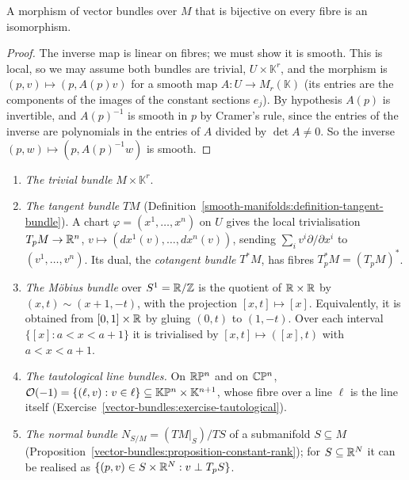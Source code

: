 \begin{lemma}\label{vector-bundles:lemma-bijective-morphism}
A morphism of vector bundles over $M$ that is bijective on every fibre is an isomorphism.
\end{lemma}

\begin{proof}
The inverse map is linear on fibres; we must show it is smooth. This is local, so we may assume both bundles are trivial, $U \times \mathbb{K}^r$, and the morphism is
$(p, v) \mapsto (p, A(p)v)$ for a smooth map $A \colon U \to M_r(\mathbb{K})$ (its entries are the components of the images of the constant sections $e_j$). By hypothesis $A(p)$ is
invertible, and $A(p)^{-1}$ is smooth in $p$ by Cramer's rule, since the entries of the inverse are polynomials in the entries of $A$ divided by $\det A \neq 0$. So the inverse
$(p, w) \mapsto (p, A(p)^{-1}w)$ is smooth.
\end{proof}

\begin{example}\label{vector-bundles:example-bundles}
\begin{enumerate}
\item \emph{The trivial bundle} $M \times \mathbb{K}^r$.
\item \emph{The tangent bundle} $TM$ (Definition~\ref{smooth-manifolds:definition-tangent-bundle}). A chart $\varphi = (x^1, \ldots, x^n)$ on $U$ gives the local trivialisation
$T_pM \to \mathbb{R}^n$, $v \mapsto (dx^1(v), \ldots, dx^n(v))$, sending $\sum_iv^i\partial/\partial x^i$ to $(v^1, \ldots, v^n)$. Its dual, the \emph{cotangent bundle} $T^*M$, has fibres
$T_p^*M = (T_pM)^*$.
\item \emph{The M\"obius bundle} over $S^1 = \mathbb{R}/\mathbb{Z}$ is the quotient of $\mathbb{R} \times \mathbb{R}$ by $(x, t) \sim (x + 1, -t)$, with the projection $[x, t] \mapsto [x]$. Equivalently,
it is obtained from $[0, 1] \times \mathbb{R}$ by gluing $(0, t)$ to $(1, -t)$. Over each interval $\{[x] : a < x < a + 1\}$ it is trivialised by $[x, t] \mapsto ([x], t)$ with
$a < x < a + 1$.
\item \emph{The tautological line bundles.} On $\mathbb{R}\mathbb{P}^n$ and on $\mathbb{C}\mathbb{P}^n$, $\mathcal{O}(-1) = \{(\ell, v) : v \in \ell\} \subseteq \mathbb{K}\mathbb{P}^n \times \mathbb{K}^{n+1}$, whose fibre over a
line $\ell$ is the line itself (Exercise~\ref{vector-bundles:exercise-tautological}).
\item \emph{The normal bundle} $N_{S/M} = (TM|_S)/TS$ of a submanifold $S \subseteq M$ (Proposition~\ref{vector-bundles:proposition-constant-rank}); for $S \subseteq \mathbb{R}^N$ it can be
realised as $\{(p, v) \in S \times \mathbb{R}^N : v \perp T_pS\}$.
\end{enumerate}
\end{example}

